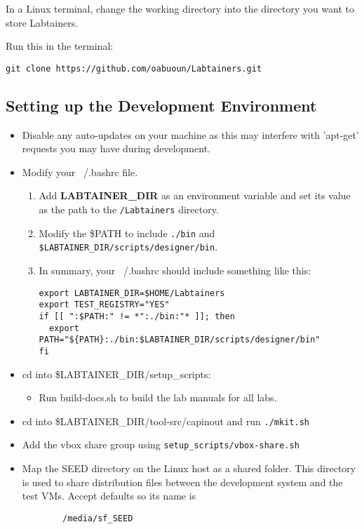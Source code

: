 \documentclass[12pt]{article}
\begin{document}
In a Linux terminal, change the working directory into the directory you want to store Labtainers.
\begin{flushleft} Run this in the terminal: \end{flushleft}
\begin{center} {\tt git clone https://github.com/oabuoun/Labtainers.git} \end{center} 

\subsection{Setting up the Development Environment}
\begin {itemize}
\item Disable any auto-updates on your machine as this may interfere with 'apt-get' requests you may have during development.
\item Modify your ~/.bashrc file.
    \begin{enumerate}
    \item Add {\bf LABTAINER\_DIR} as an environment variable and set its value as the path to the {\tt  /Labtainers} directory. 
    \item Modify the \$PATH to include {\tt ./bin} and {\tt \$LABTAINER\_DIR/scripts/designer/bin}.
    \item In summary, your ~/.bashrc should include something like this:
	    \lstset{basicstyle=\footnotesize\ttfamily,
		    breaklines=true
	    	    framextopmargin=50pt
		    frame=single,
		    language=bash}
	    \begin{mdframed}
	    \begin{lstlisting}
export LABTAINER_DIR=$HOME/Labtainers
export TEST_REGISTRY="YES"
if [[ ":$PATH:" != *":./bin:"* ]]; then
  export PATH="${PATH}:./bin:$LABTAINER_DIR/scripts/designer/bin"
fi
	    \end{lstlisting}
	    \end{mdframed}
    \end{enumerate}
\item cd into \$LABTAINER\_DIR/setup\_scripts:
    \begin{itemize}
    	\item Run build-docs.sh to build the lab manuals for all labs.
    \end{itemize}
\item cd into \$LABTAINER\_DIR/tool-src/capinout and run {\tt ./mkit.sh}
\item Add the vbox share group using {\tt setup\_scripts/vbox-share.sh} 
\item Map the SEED directory on the Linux host as a shared folder. This directory is used
to share distribution files between the development system and the test VMs.  Accept defaults so its name is 
\begin{verbatim}
        /media/sf_SEED
\end{verbatim}
\end {itemize}
\end{document}
